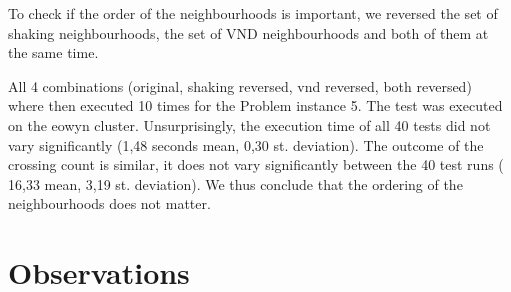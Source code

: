 \documentclass [11pt]{article}
\begin{document}
To check if the order of the neighbourhoods is important, we reversed the set of shaking neighbourhoods, the set of VND neighbourhoods and both of them at the same time.

All 4 combinations (original, shaking reversed, vnd reversed, both reversed) where then executed 10 times for the Problem instance 5. The test was executed on the eowyn cluster. Unsurprisingly, the execution time of all 40 tests did not vary significantly (1,48 seconds mean, 0,30 st. deviation). The outcome of the crossing count is similar, it does not vary significantly between the 40 test runs ( 16,33 mean, 3,19 st. deviation). We thus conclude that the ordering of the neighbourhoods does not matter.






\section{Observations}
\end{document}
